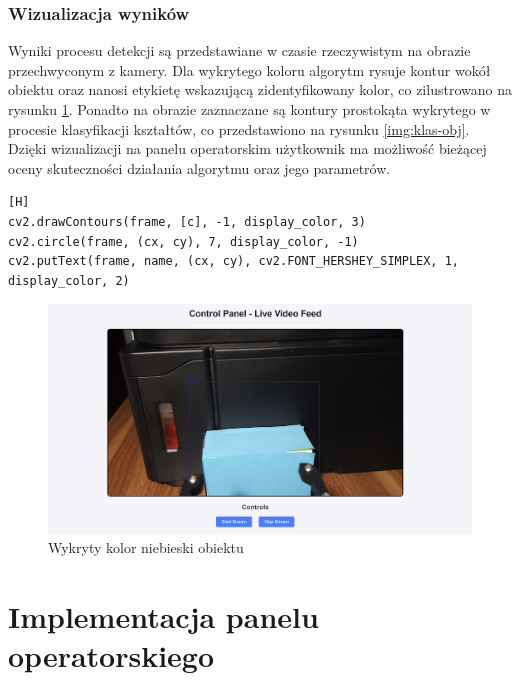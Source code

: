 \subsubsection{Wizualizacja wyników}

Wyniki procesu detekcji są przedstawiane w czasie rzeczywistym na obrazie przechwyconym z kamery. Dla wykrytego koloru algorytm rysuje kontur wokół obiektu oraz nanosi etykietę wskazującą zidentyfikowany kolor, co zilustrowano na rysunku \ref{img:kolor-detect}. Ponadto na obrazie zaznaczane są kontury prostokąta wykrytego w procesie klasyfikacji kształtów, co przedstawiono na rysunku \ref{img:klas-obj}. Dzięki wizualizacji na panelu operatorskim użytkownik ma możliwość bieżącej oceny skuteczności działania algorytmu oraz jego parametrów.

\vspace*{0.5cm}


\begin{lstlisting}[caption=Kod wizualizacji wyników detekcji kolorów i kształtów, label=fig:visualization, captionpos=b][H]
cv2.drawContours(frame, [c], -1, display_color, 3)
cv2.circle(frame, (cx, cy), 7, display_color, -1)
cv2.putText(frame, name, (cx, cy), cv2.FONT_HERSHEY_SIMPLEX, 1, display_color, 2)
\end{lstlisting}


\begin{figure}[H]
  \centering
  \includegraphics[width=1.0\textwidth]{./graf/kolory.png}
  \caption{Wykryty kolor niebieski obiektu}
  \label{img:kolor-detect}
\end{figure}

\section{Implementacja panelu operatorskiego}

